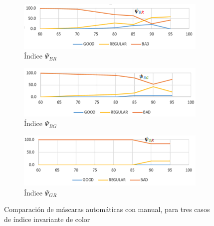 \begin{figure}[H]
    \centering
  \begin{subfigure}[b]{\textwidth}
    \includegraphics[width=\textwidth]{Imagenes/psiBR.png}
     \hfill
     \caption{Índice $\Psi_{BR}$}
    \label{psiazulrojo}
 \end{subfigure}

 \begin{subfigure}[b]{\textwidth}
    \includegraphics[width=\textwidth]{Imagenes/psiBG.png}
     \hfill
     \caption{Índice $\Psi_{BG}$}
    \label{psiazulverde}
 \end{subfigure}

 \begin{subfigure}[b]{\textwidth}
    \includegraphics[width=\textwidth]{Imagenes/psiGR.png}
     \hfill
     \caption{Índice $\Psi_{GR}$}
    \label{psiverderojo}
 \end{subfigure}
 \caption{Comparación de máscaras automáticas con manual, para tres casos de índice invariante de color}
        \label{compara_mascara}
\end{figure}